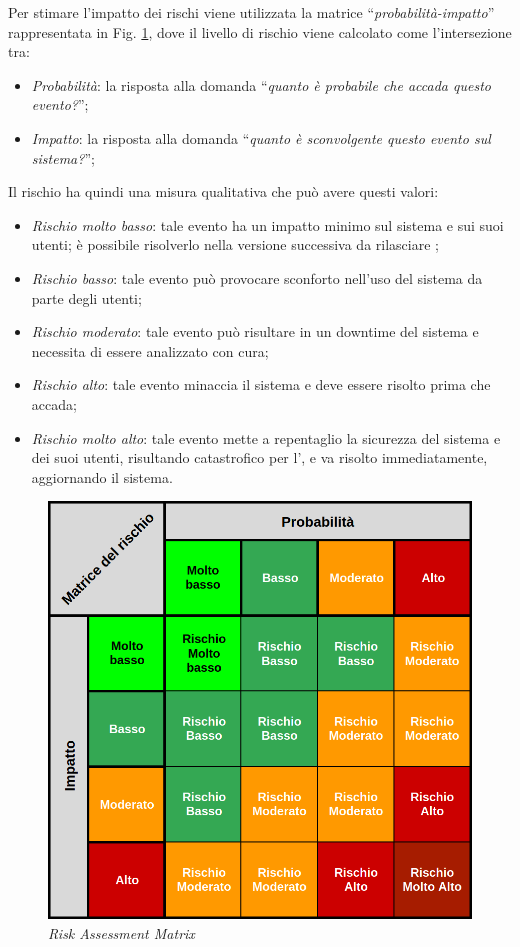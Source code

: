	Per stimare l'impatto dei rischi viene utilizzata la matrice ``\textit{probabilità-impatto}'' rappresentata in Fig. \ref{fig:risk_matrix}, dove il livello di rischio viene calcolato come l'intersezione tra:
	\begin{itemize}[noitemsep]
		\item \textit{Probabilità}: la risposta alla domanda ``\textit{quanto è probabile che accada questo evento?}'';
		\item \textit{Impatto}: la risposta alla domanda ``\textit{quanto è sconvolgente questo evento sul sistema?}'';
	\end{itemize}
	Il rischio ha quindi una misura qualitativa che può avere questi valori:
	\begin{itemize}[noitemsep]
		\item \textit{Rischio molto basso}: tale evento ha un impatto minimo sul sistema e sui suoi utenti; è possibile risolverlo nella versione successiva da rilasciare ;
		\item \textit{Rischio basso}: tale evento può provocare sconforto nell'uso del sistema da parte degli utenti;
		\item \textit{Rischio moderato}: tale evento può risultare in un downtime del sistema e necessita di essere analizzato con cura;
		\item \textit{Rischio alto}: tale evento minaccia il sistema e deve essere risolto prima che accada;
		\item \textit{Rischio molto alto}: tale evento mette a repentaglio la sicurezza del sistema e dei suoi utenti, risultando catastrofico per l'\istituto, e va risolto immediatamente, aggiornando il sistema.
	\end{itemize}
	
	\begin{figure}[h!]
		\centering
		\includegraphics[width=\linewidth]{img/matrix.png}
		\caption{\textit{Risk Assessment Matrix}}
		\label{fig:risk_matrix}
	\end{figure}

